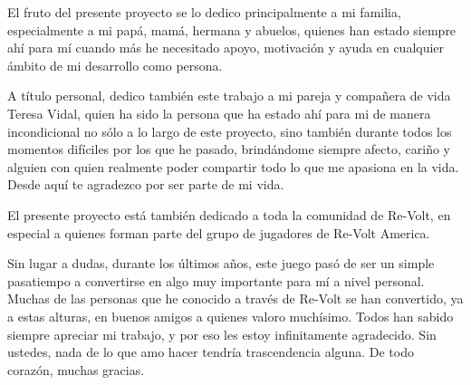 El fruto del presente proyecto se lo dedico principalmente a mi familia, especialmente a mi papá, mamá, hermana y abuelos, quienes han estado siempre ahí para mí cuando más he necesitado apoyo, motivación y ayuda en cualquier ámbito de mi desarrollo como persona.

A título personal, dedico también este trabajo a mi pareja y compañera de vida Teresa Vidal, quien ha sido la persona que ha estado ahí para mi de manera incondicional no sólo a lo largo de este proyecto, sino también durante todos los momentos difíciles por los que he pasado, brindándome siempre afecto, cariño y alguien con quien realmente poder compartir todo lo que me apasiona en la vida. Desde aquí te agradezco por ser parte de mi vida.

El presente proyecto está también dedicado a toda la comunidad de Re-Volt, en especial a quienes forman parte del grupo de jugadores de Re-Volt America.

Sin lugar a dudas, durante los últimos años, este juego pasó de ser un simple pasatiempo a convertirse en algo muy importante para mí a nivel personal. Muchas de las personas que he conocido a través de Re-Volt se han convertido, ya a estas alturas, en buenos amigos a quienes valoro muchísimo. Todos han sabido siempre apreciar mi trabajo, y por eso les estoy infinitamente agradecido. Sin ustedes, nada de lo que amo hacer tendría trascendencia alguna. De todo corazón, muchas gracias.
